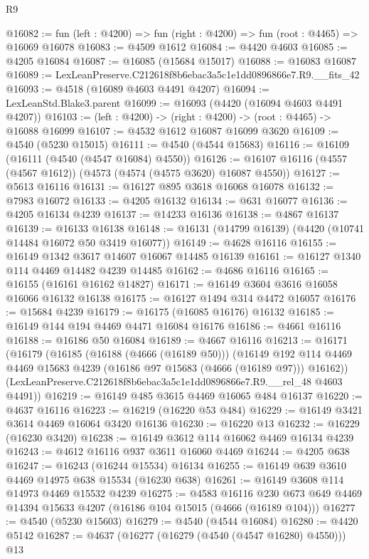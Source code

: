 \begin{lexlean}{R9}
\begin{coremodule}
@16082 := fun (left : @4200) => fun (right : @4200) => fun (root : @4465) => @16069 @16078
@16083 := @4509 @1612
@16084 := @4420 @4603
@16085 := @4205 @16084
@16087 := @16085 (@15684 @15017)
@16088 := @16083 @16087
@16089 := LexLeanPreserve.C212618f8b6ebac3a5c1e1dd0896866e7.R9.__fits_42
@16093 := @4518 (@16089 @4603 @4491 @4207)
@16094 := LexLeanStd.Blake3.parent
@16099 := @16093 (@4420 (@16094 @4603 @4491 @4207))
@16103 := (left : @4200) -> (right : @4200) -> (root : @4465) -> @16088 @16099
@16107 := @4532 @1612 @16087 @16099 @3620
@16109 := @4540 (@5230 @15015)
@16111 := @4540 (@4544 @15683)
@16116 := @16109 (@16111 (@4540 (@4547 @16084) @4550))
@16126 := @16107 @16116 (@4557 (@4567 @1612)) (@4573 (@4574 (@4575 @3620) @16087 @4550))
@16127 := @5613 @16116
@16131 := @16127 @895 @3618 @16068 @16078
@16132 := @7983 @16072
@16133 := @4205 @16132
@16134 := @631 @16077
@16136 := @4205 @16134 @4239
@16137 := @14233 @16136
@16138 := @4867 @16137
@16139 := @16133 @16138
@16148 := @16131 (@14799 @16139) (@4420 (@10741 @14484 @16072 @50 @3419 @16077))
@16149 := @4628 @16116
@16155 := @16149 @1342 @3617 @14607 @16067 @14485 @16139
@16161 := @16127 @1340 @114 @4469 @14482 @4239 @14485
@16162 := @4686 @16116
@16165 := @16155 (@16161 @16162 @14827)
@16171 := @16149 @3604 @3616 @16058 @16066 @16132 @16138
@16175 := @16127 @1494 @314 @4472 @16057
@16176 := @15684 @4239
@16179 := @16175 (@16085 @16176) @16132
@16185 := @16149 @144 @194 @4469 @4471 @16084 @16176
@16186 := @4661 @16116
@16188 := @16186 @50 @16084
@16189 := @4667 @16116
@16213 := @16171
    (@16179
      (@16185
        (@16188 (@4666 (@16189 @50)))
        (@16149 @192 @114 @4469 @4469 @15683 @4239 (@16186 @97 @15683 (@4666 (@16189 @97))) @16162))
      (LexLeanPreserve.C212618f8b6ebac3a5c1e1dd0896866e7.R9.__rel_48 @4603 @4491))
@16219 := @16149 @485 @3615 @4469 @16065 @484 @16137
@16220 := @4637 @16116
@16223 := @16219 (@16220 @53 @484)
@16229 := @16149 @3421 @3614 @4469 @16064 @3420 @16136
@16230 := @16220 @13
@16232 := @16229 (@16230 @3420)
@16238 := @16149 @3612 @114 @16062 @4469 @16134 @4239
@16243 := @4612 @16116 @937 @3611 @16060 @4469
@16244 := @4205 @638
@16247 := @16243 (@16244 @15534) @16134
@16255 := @16149 @639 @3610 @4469 @14975 @638 @15534 (@16230 @638)
@16261 := @16149 @3608 @114 @14973 @4469 @15532 @4239
@16275 := @4583
    @16116
    @230
    @673
    @649
    @4469
    @14394
    @15633
    @4207
    (@16186 @104 @15015 (@4666 (@16189 @104)))
@16277 := @4540 (@5230 @15603)
@16279 := @4540 (@4544 @16084)
@16280 := @4420 @5142
@16287 := @4637 (@16277 (@16279 (@4540 (@4547 @16280) @4550))) @13

\end{coremodule}
\end{lexlean}
